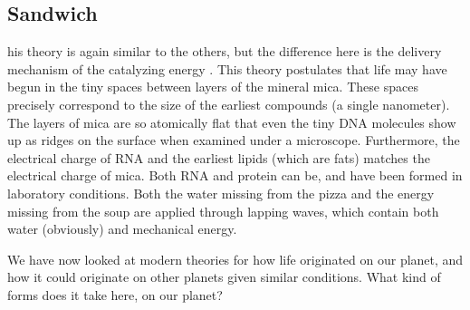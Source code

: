 \subsection{Sandwich}
his theory is again similar to the others, but the difference here is the delivery mechanism of the catalyzing energy \cite{szosa}.
This theory postulates that life may have begun in the tiny spaces between layers of the mineral mica.
These spaces precisely correspond to the size of the earliest compounds (a single nanometer).
The layers of mica are so atomically flat that even the tiny DNA molecules show up as ridges on the surface when examined under a microscope.
Furthermore, the electrical charge of RNA and the earliest lipids (which are fats) matches the electrical charge of mica.
Both RNA and protein can be, and have been formed in laboratory conditions.
Both the water missing from the pizza and the energy missing from the soup are applied through lapping waves, which contain both water (obviously) and mechanical energy.

We have now looked at modern theories for how life originated on our planet, and how it could originate on other planets given similar conditions. What kind of forms does it take here, on our planet?